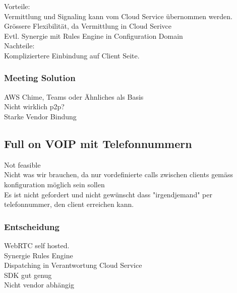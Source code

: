 Vorteile: \\

Vermittlung und Signaling kann vom Cloud Service übernommen werden. \\
Grössere Flexibilität, da Vermittlung in Cloud Serivce \\
Evtl. Synergie mit Rules Engine in Configuration Domain \\

Nachteile: \\

Kompliziertere Einbindung auf Client Seite.


\subsubsection*{Meeting Solution}

AWS Chime, Teams oder Ähnliches als Basis \\
Nicht wirklich p2p? \\
Starke Vendor Bindung \\



\subsection*{Full on VOIP mit Telefonnummern}

Not feasible \\
Nicht was wir brauchen, da nur vordefinierte calls zwischen clients gemäss konfiguration möglich sein sollen \\
Es ist nicht gefordert und nicht gewünscht dass "irgendjemand" per telefonnummer, den client erreichen kann. \\


\subsubsection*{Entscheidung}

WebRTC self hosted. \\

Synergie Rules Engine \\
Dispatching in Verantwortung Cloud Service \\
SDK gut genug \\
Nicht vendor abhängig \\


\clearpage
